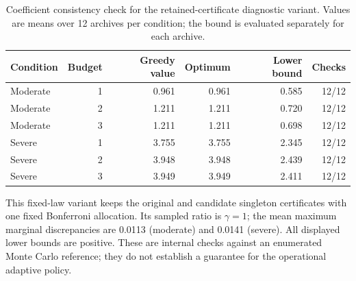 \begin{table}[htbp]
\centering\small
\setlength{\tabcolsep}{4pt}
\caption{Coefficient consistency check for the retained-certificate diagnostic variant. Values are means over 12 archives per condition; the bound is evaluated separately for each archive.}
\label{tab:ext-retained}
\begin{tabular}{lrrrrr}
\toprule
Condition & Budget & Greedy value & Optimum & Lower bound & Checks \\
\midrule
Moderate & 1 & 0.961 & 0.961 & 0.585 & 12/12 \\
Moderate & 2 & 1.211 & 1.211 & 0.720 & 12/12 \\
Moderate & 3 & 1.211 & 1.211 & 0.698 & 12/12 \\
Severe & 1 & 3.755 & 3.755 & 2.345 & 12/12 \\
Severe & 2 & 3.948 & 3.948 & 2.439 & 12/12 \\
Severe & 3 & 3.949 & 3.949 & 2.411 & 12/12 \\
\bottomrule
\end{tabular}
\par\smallskip\begin{minipage}{0.97\linewidth}\footnotesize This fixed-law variant keeps the original and candidate singleton certificates with one fixed Bonferroni allocation. Its sampled ratio is $\gamma=1$; the mean maximum marginal discrepancies are 0.0113 (moderate) and 0.0141 (severe). All displayed lower bounds are positive. These are internal checks against an enumerated Monte Carlo reference; they do not establish a guarantee for the operational adaptive policy.\end{minipage}
\end{table}
